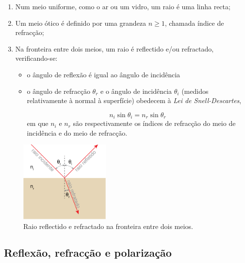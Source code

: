 \documentclass[12pt,a4paper,oneside]{paper}
\begin{document}
\begin{enumerate}
\item Num meio uniforme, como o ar ou um vidro, um raio é uma linha recta;
\item Um meio ótico é definido por uma grandeza $n\geq1$, chamada índice de refracção;
\item Na fronteira entre dois meios, um raio é reflectido e/ou refractado, verificando-se:
\begin{itemize}
\item o ângulo de reflexão é igual ao ângulo de incidência
\item o ângulo de refracção $\theta_r$ e o ângulo de incidência $\theta_i$ (medidos relativamente à normal à superfície)
obedecem à \emph{Lei de Snell-Descartes},

\begin{equation}
n_i\sin{\theta_i}=n_r\sin{\theta_r}
\end{equation}
em que $n_i$ e $n_r$ são respectivamente os índices de refracção do meio de incidência e do meio de refracção.
\end{itemize}
\end{enumerate}
\begin{figure}
\begin{center}
	\includegraphics[width=0.4\textwidth]{./otica_images/1-snell}
	\caption{Raio reflectido e refractado na fronteira entre dois meios.}
	 \label{fig:snell}
\end{center}
\end{figure}

\subsection{\sf Reflexão, refracção e polarização}
\end{document}
